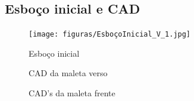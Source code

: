 \begin{apendicesenv}
\chapter{Esboço inicial e CAD}
\label{CAD}

\begin{figure}[htb]
    \centering
    \texttt{[image: figuras/EsboçoInicial\_V\_1.jpg]}
    \caption{Esboço inicial}
    \label{fig:esboço}
\end{figure}

\begin{figure} [H]
\centering
  \caption{CAD da maleta verso}
\end{figure}

\begin{figure} [H]
\centering
  \caption{CAD's da maleta frente}
\end{figure}


\end{apendicesenv}
